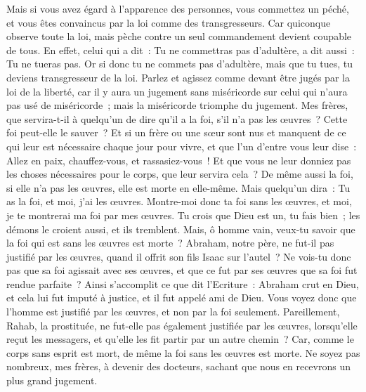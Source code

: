 \begin{multicols}{2}
Mais si vous avez égard à l'apparence des personnes, vous commettez un péché, et vous êtes convaincus par la loi comme des transgresseurs.
Car quiconque observe toute la loi, mais pèche contre un seul commandement devient coupable de tous.
En effet, celui qui a dit~: Tu ne commettras pas d'adultère, a dit aussi~: Tu ne tueras pas. Or si donc tu ne commets pas d'adultère, mais que tu tues, tu deviens transgresseur de la loi.
Parlez et agissez comme devant être jugés par la loi de la liberté,
car il y aura un jugement sans miséricorde sur celui qui n'aura pas usé de miséricorde~; mais la miséricorde triomphe du jugement.
Mes frères, que servira-t-il à quelqu'un de dire qu'il a la foi, s'il n'a pas les œuvres~? Cette foi peut-elle le sauver~?
Et si un frère ou une sœur sont nus et manquent de ce qui leur est nécessaire chaque jour pour vivre,
et que l'un d'entre vous leur dise~: Allez en paix, chauffez-vous, et rassasiez-vous~! Et que vous ne leur donniez pas les choses nécessaires pour le corps, que leur servira cela~?
De même aussi la foi, si elle n'a pas les œuvres, elle est morte en elle-même.
Mais quelqu'un dira~: Tu as la foi, et moi, j'ai les œuvres. Montre-moi donc ta foi sans les œuvres, et moi, je te montrerai ma foi par mes œuvres.
Tu crois que Dieu est un, tu fais bien~; les démons le croient aussi, et ils tremblent.
Mais, ô homme vain, veux-tu savoir que la foi qui est sans les œuvres est morte~?
Abraham, notre père, ne fut-il pas justifié par les œuvres, quand il offrit son fils Isaac sur l'autel~?
Ne vois-tu donc pas que sa foi agissait avec ses œuvres, et que ce fut par ses œuvres que sa foi fut rendue parfaite~?
Ainsi s'accomplit ce que dit l'Ecriture~: Abraham crut en Dieu, et cela lui fut imputé à justice, et il fut appelé ami de Dieu.
Vous voyez donc que l'homme est justifié par les œuvres, et non par la foi seulement.
Pareillement, Rahab, la prostituée, ne fut-elle pas également justifiée par les œuvres, lorsqu'elle reçut les messagers, et qu'elle les fit partir par un autre chemin~?
Car, comme le corps sans esprit est mort, de même la foi sans les œuvres est morte.
\VerseOne{}Ne soyez pas nombreux, mes frères, à devenir des docteurs, sachant que nous en recevrons un plus grand jugement.

\end{multicols}
